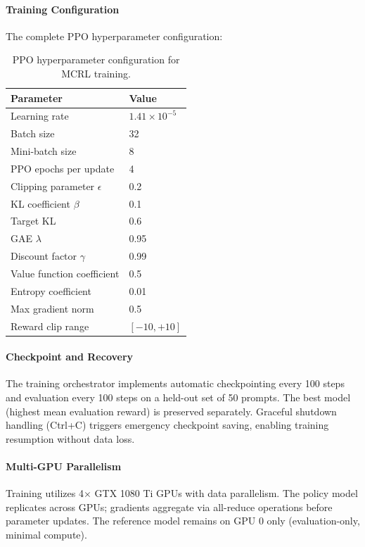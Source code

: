 \documentclass[11pt]{article}
\begin{document}
\paragraph{Training Configuration}
The complete PPO hyperparameter configuration:

\begin{table}[h]
\centering
\begin{tabular}{ll}
\toprule
\textbf{Parameter} & \textbf{Value} \\
\midrule
Learning rate & $1.41 \times 10^{-5}$ \\
Batch size & 32 \\
Mini-batch size & 8 \\
PPO epochs per update & 4 \\
Clipping parameter $\epsilon$ & 0.2 \\
KL coefficient $\beta$ & 0.1 \\
Target KL & 0.6 \\
GAE $\lambda$ & 0.95 \\
Discount factor $\gamma$ & 0.99 \\
Value function coefficient & 0.5 \\
Entropy coefficient & 0.01 \\
Max gradient norm & 0.5 \\
Reward clip range & $[-10, +10]$ \\
\bottomrule
\end{tabular}
\caption{PPO hyperparameter configuration for MCRL training.}
\end{table}

\paragraph{Checkpoint and Recovery}
The training orchestrator implements automatic checkpointing every 100 steps and evaluation every 100 steps on a held-out set of 50 prompts. The best model (highest mean evaluation reward) is preserved separately. Graceful shutdown handling (Ctrl+C) triggers emergency checkpoint saving, enabling training resumption without data loss.

\paragraph{Multi-GPU Parallelism}
Training utilizes 4$\times$ GTX 1080 Ti GPUs with data parallelism. The policy model replicates across GPUs; gradients aggregate via all-reduce operations before parameter updates. The reference model remains on GPU 0 only (evaluation-only, minimal compute).
\end{document}
